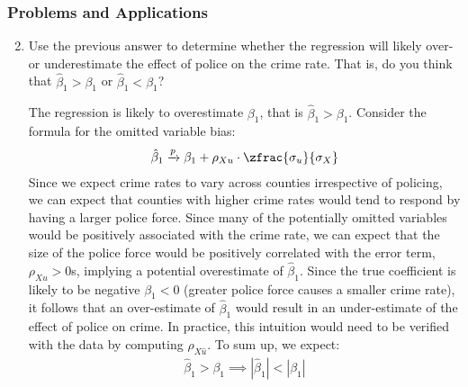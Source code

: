 \begin{frame}
\frametitle{Problems and Applications}

\begin{enumerate}\setcounter{enumi}{1}

\item Use the previous answer to determine whether the regression will likely over- or underestimate the effect of police on the crime rate. That is, do you think that $\hat{\beta}_{1}>\beta_{1}$ or $\hat{\beta}_{1}<\beta_{1}$?

\begin{answer}
The regression is likely to overestimate $\beta_{1}$, that is $\hat{\beta}_{1}>\beta_{1}$. Consider the formula for the omitted variable bias:
\begin{align*}
\hat{\beta}_{1} \xrightarrow{p} \beta_{1} + \rho_{Xu} \cdot \zfrac{\sigma_{u}}{\sigma_{X}}
\end{align*}
Since we expect crime rates to vary across counties irrespective of policing, we can expect that counties with higher crime rates would tend to respond by having a larger police force. Since many of the potentially omitted variables would be positively associated with the crime rate, we can expect that the size of the police force would be positively correlated with the error term, $\rho_{Xu}>0$s, implying a potential overestimate of $\hat{\beta}_{1}$. Since the true coefficient is likely to be negative $\beta_{1}<0$ (greater police force causes a smaller crime rate), it follows that an over-estimate of $\hat{\beta}_{1}$ would result in an under-estimate of the effect of police on crime. In practice, this intuition would need to be verified with the data by computing $\rho_{X\hat{u}}$. To sum up, we expect:
\vspace*{-2ex}\emph{\begin{align*}
\hat{\beta}_{1}>\beta_{1}
\implies 
|\hat{\beta}_{1}| < |\beta_{1}|
\end{align*}}
\end{answer}

\end{enumerate}
\end{frame}




